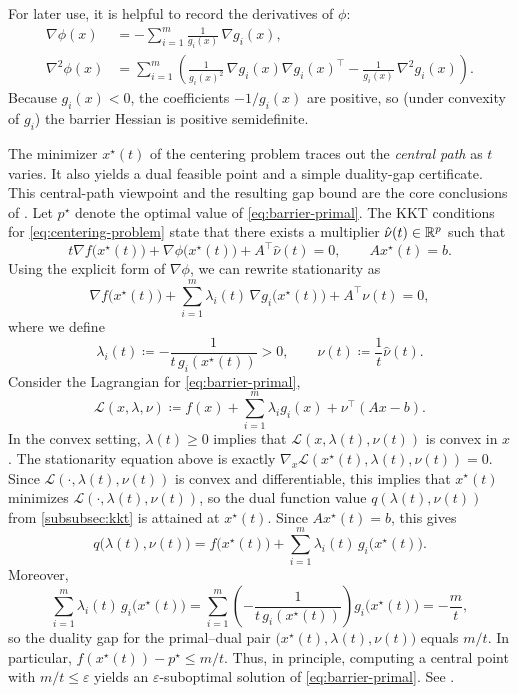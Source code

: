 For later use, it is helpful to record the derivatives of $\phi$:
\begin{align*}
  \nabla \phi(x)
  &= -\sum_{i=1}^m \frac{1}{g_i(x)}\,\nabla g_i(x), \\
  \nabla^2 \phi(x)
  &= \sum_{i=1}^m\left(\frac{1}{g_i(x)^2}\,\nabla g_i(x)\nabla g_i(x)^\top - \frac{1}{g_i(x)}\,\nabla^2 g_i(x)\right).
\end{align*}
Because $g_i(x)<0$, the coefficients $-1/g_i(x)$ are positive, so (under convexity of $g_i$) the barrier Hessian is positive semidefinite.

The minimizer $x^\star(t)$ of the centering problem traces out the \emph{central path} as $t$ varies.
It also yields a dual feasible point and a simple duality-gap certificate.
This central-path viewpoint and the resulting gap bound are the core conclusions of \citet[\S11.3]{boyd_vandenberghe_2004_convex}.
Let $p^\star$ denote the optimal value of \eqref{eq:barrier-primal}.
The KKT conditions for \eqref{eq:centering-problem} state that there exists a multiplier $\hat\nu(t)\in\mathbb{R}^p$ such that
\begin{equation}
  t\nabla f\bigl(x^\star(t)\bigr) + \nabla \phi\bigl(x^\star(t)\bigr) + A^\top \hat\nu(t)=0,
  \qquad
  Ax^\star(t)=b.
  \label{eq:centering-kkt}
\end{equation}
Using the explicit form of $\nabla \phi$, we can rewrite stationarity as
\[
  \nabla f\bigl(x^\star(t)\bigr) + \sum_{i=1}^m \lambda_i(t)\,\nabla g_i\bigl(x^\star(t)\bigr) + A^\top \nu(t)=0,
\]
where we define
\[
  \lambda_i(t)\coloneqq -\frac{1}{t\,g_i(x^\star(t))}>0,
  \qquad
  \nu(t)\coloneqq \frac{1}{t}\hat\nu(t).
\]
Consider the Lagrangian for \eqref{eq:barrier-primal},
\[
  \mathcal{L}(x,\lambda,\nu)\coloneqq f(x) + \sum_{i=1}^m \lambda_i g_i(x) + \nu^\top(Ax-b).
\]
In the convex setting, $\lambda(t)\ge 0$ implies that $\mathcal{L}(x,\lambda(t),\nu(t))$ is convex in $x$.
The stationarity equation above is exactly $\nabla_x \mathcal{L}(x^\star(t),\lambda(t),\nu(t))=0$.
Since $\mathcal{L}(\cdot,\lambda(t),\nu(t))$ is convex and differentiable, this implies that $x^\star(t)$ minimizes $\mathcal{L}(\cdot,\lambda(t),\nu(t))$, so the dual function value $q(\lambda(t),\nu(t))$ from \cref{subsubsec:kkt} is attained at $x^\star(t)$.
Since $Ax^\star(t)=b$, this gives
\[
  q\bigl(\lambda(t),\nu(t)\bigr)=f\bigl(x^\star(t)\bigr)+\sum_{i=1}^m \lambda_i(t)\,g_i\bigl(x^\star(t)\bigr).
\]
Moreover,
\[
  \sum_{i=1}^m \lambda_i(t)\,g_i\bigl(x^\star(t)\bigr)
  = \sum_{i=1}^m \left(-\frac{1}{t\,g_i(x^\star(t))}\right) g_i\bigl(x^\star(t)\bigr)
  = -\frac{m}{t},
\]
so the duality gap for the primal--dual pair $\bigl(x^\star(t),\lambda(t),\nu(t)\bigr)$ equals $m/t$.
In particular, $f(x^\star(t)) - p^\star \le m/t$.
Thus, in principle, computing a central point with $m/t\le \varepsilon$ yields an $\varepsilon$-suboptimal solution of \eqref{eq:barrier-primal}.
See \citet[\S11.2]{boyd_vandenberghe_2004_convex}.

